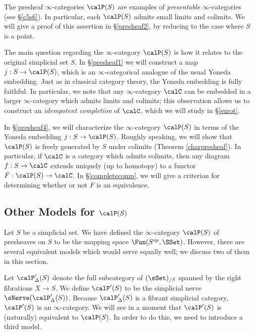The presheaf $\infty$-categories $\calP(S)$ are examples of {\em presentable} $\infty$-categories (see \S \ref{c5s6}). In particular, each $\calP(S)$ admits small limits and colimits. We will give a proof of this assertion in \S \ref{presheaf2}, by reducing to the case where $S$ is a point.

The main question regarding the $\infty$-category $\calP(S)$ is how it relates to the original simplicial set $S$. In \S \ref{presheaf1} we will construct a map $j: S \rightarrow \calP(S)$, which is an $\infty$-categorical analogue of the usual Yoneda embedding. Just as in classical category theory, the Yoneda embedding is fully faithful. In particular, we note that any $\infty$-category $\calC$ can be embedded in a larger $\infty$-category which admits limits and colimits; this observation allows us to construct an {\it idempotent completion} of $\calC$, which we will study in \S \ref{surot}.

In \S \ref{presheaf4}, we will characterize the $\infty$-category $\calP(S)$ in terms of the Yoneda embedding $j: S \rightarrow \calP(S)$. Roughly speaking, we will show that $\calP(S)$ is freely generated by $S$ under colimits (Theorem \ref{charpresheaf}). In particular, if $\calC$ is a category which admits colimits, then any diagram $f: S \rightarrow \calC$ extends uniquely (up to homotopy) to a functor $F: \calP(S) \rightarrow \calC$. In \S \ref{completecomp}, we will give a criterion for determining whether or not $F$ is an equivalence.

\subsection{Other Models for $\calP(S)$}\label{presheaf3}

Let $S$ be a simplicial set. We have defined the $\infty$-category $\calP(S)$ of presheaves on $S$ to be the mapping space $\Fun(S^{op}, \SSet)$. However, there are several equivalent models which would serve equally well; we discuss two of them in this section.

Let $\calP'_{\Delta}(S)$ denote the full subcategory of
$(\sSet)_{/S}$ spanned by the right fibrations $X \rightarrow S$. We define $\calP'(S)$ to be the simplicial nerve $\sNerve(\calP'_{\Delta}(S))$. Because $\calP'_{\Delta}(S)$ is a fibrant simplicial category, $\calP'(S)$ is an $\infty$-category. We will see in a moment that $\calP'(S)$ is (naturally) equivalent to $\calP(S)$. In order to do this, we need to introduce a third model.

